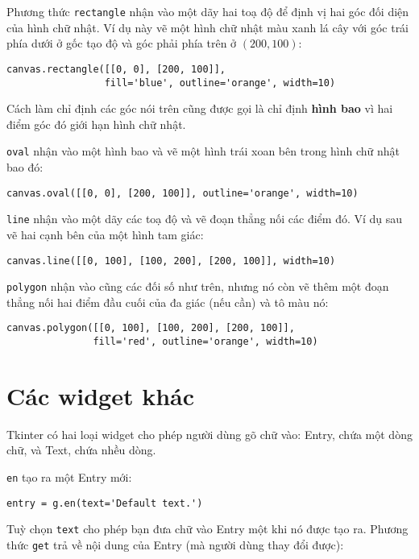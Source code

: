 \documentclass[11pt]{book}
\begin{document}

Phương thức {\tt rectangle} nhận vào một dãy hai toạ độ để
định vị hai góc đối diện của hình chữ nhật.  Ví dụ này vẽ một
hình chữ nhật màu xanh lá cây với góc trái phía dưới ở gốc tạo độ
và góc phải phía trên ở $(200, 100)$:

\beforeverb
\begin{verbatim}
canvas.rectangle([[0, 0], [200, 100]], 
                 fill='blue', outline='orange', width=10)
\end{verbatim}
\afterverb
%
Cách làm chỉ định các góc nói trên cũng được gọi là chỉ định 
{\bf hình bao} vì hai điểm góc đó giới hạn hình chữ nhật.


{\tt oval} nhận vào một hình bao và vẽ một hình trái xoan
bên trong hình chữ nhật bao đó:

\beforeverb
\begin{verbatim}
canvas.oval([[0, 0], [200, 100]], outline='orange', width=10)
\end{verbatim}
\afterverb
%
{\tt line} nhận vào một dãy các toạ độ và vẽ đoạn thẳng nối
các điểm đó. Ví dụ sau vẽ hai cạnh bên của một hình tam giác:

\beforeverb
\begin{verbatim}
canvas.line([[0, 100], [100, 200], [200, 100]], width=10)
\end{verbatim}
\afterverb
%
{\tt polygon} nhận vào cũng các đối số như trên, nhưng nó còn
vẽ thêm một đoạn thẳng nối hai điểm đầu cuối của đa giác
(nếu cần) và tô màu nó:

\beforeverb
\begin{verbatim}
canvas.polygon([[0, 100], [100, 200], [200, 100]],
               fill='red', outline='orange', width=10)
\end{verbatim}
\afterverb
%


\section{Các widget khác}


Tkinter có hai loại widget cho phép người dùng gõ chữ vào: 
Entry, chứa một dòng chữ, và Text, chứa nhều dòng.


{\tt en} tạo ra một Entry mới:

\beforeverb
\begin{verbatim}
entry = g.en(text='Default text.')
\end{verbatim}
\afterverb
%
Tuỳ chọn {\tt text} cho phép bạn đưa chữ vào Entry một khi nó
được tạo ra. Phương thức {\tt get} trả về nội dung của
Entry (mà người dùng thay đổi được):
\end{document}
